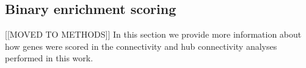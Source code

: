 \documentclass[10pt,letterpaper]{article}
\begin{document}
{\subsection*{Binary enrichment scoring}
[[MOVED TO METHODS]]
In this section we provide more information about how genes were scored in the connectivity and hub connectivity analyses performed in this work.



}
\end{document}
